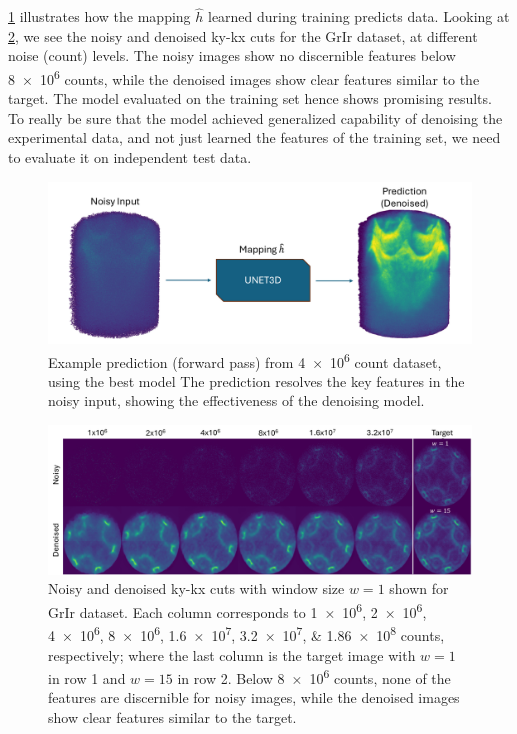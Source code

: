 \cref{fig:3d-image-noisy-denoised-training} illustrates how the mapping $\hat{h}$ learned during training predicts data. Looking at \cref{fig:images-noisy-denoised-training}, we see the noisy and denoised \gls{ky}-\gls{kx} cuts for the \gls{GrIr} dataset, at different noise (count) levels. The noisy images show no discernible features below \num{8e6} counts, while the denoised images show clear features similar to the target. The model evaluated on the training set hence shows promising results. To really be sure that the model achieved generalized capability of denoising the experimental data, and not just learned the features of the training set, we need to evaluate it on independent test data.
\begin{figure}[h]
    \centering
    \includegraphics[width=1\linewidth]{images/noisy_denoised_3d.pdf}
    \caption{Example prediction (forward pass) from \num{4e6} count dataset, using the best model The prediction resolves the key features in the noisy input, showing the effectiveness of the denoising model.}
    \label{fig:3d-image-noisy-denoised-training}
\end{figure}


\begin{figure}[h]
    \centering
    \includegraphics[width=1\linewidth]{images/images_noisy_denoised_with_target.pdf}
    \caption{Noisy and denoised \gls{ky}-\gls{kx} cuts with window size $w=1$ shown for \gls{GrIr} dataset. Each column corresponds to \numlist{1e6;2e6;4e6;8e6;1.6e7;3.2e7;1.86e8} counts, respectively; where the last column is the target image with $w=1$ in row 1 and $w=15$ in row 2. Below \num{8e6} counts, none of the features are discernible for noisy images, while the denoised images show clear features similar to the target.}
    \label{fig:images-noisy-denoised-training}
\end{figure}

